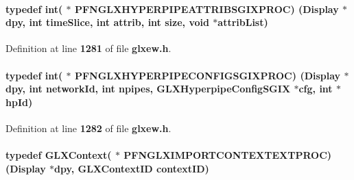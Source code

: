 \paragraph[{P\+F\+N\+G\+L\+X\+H\+Y\+P\+E\+R\+P\+I\+P\+E\+A\+T\+T\+R\+I\+B\+S\+G\+I\+X\+P\+R\+OC}]{\setlength{\rightskip}{0pt plus 5cm}typedef {\bf int}( $\ast$  P\+F\+N\+G\+L\+X\+H\+Y\+P\+E\+R\+P\+I\+P\+E\+A\+T\+T\+R\+I\+B\+S\+G\+I\+X\+P\+R\+OC) (Display $\ast$dpy, {\bf int} time\+Slice, {\bf int} attrib, {\bf int} {\bf size}, {\bf void} $\ast${\bf attrib\+List})}\label{glxew_8h_a8018a0c9128e5b524636d77ee15e4ef1}


Definition at line {\bf 1281} of file {\bf glxew.\+h}.

\paragraph[{P\+F\+N\+G\+L\+X\+H\+Y\+P\+E\+R\+P\+I\+P\+E\+C\+O\+N\+F\+I\+G\+S\+G\+I\+X\+P\+R\+OC}]{\setlength{\rightskip}{0pt plus 5cm}typedef {\bf int}( $\ast$  P\+F\+N\+G\+L\+X\+H\+Y\+P\+E\+R\+P\+I\+P\+E\+C\+O\+N\+F\+I\+G\+S\+G\+I\+X\+P\+R\+OC) (Display $\ast$dpy, {\bf int} network\+Id, {\bf int} npipes, {\bf G\+L\+X\+Hyperpipe\+Config\+S\+G\+IX} $\ast$cfg, {\bf int} $\ast$hp\+Id)}\label{glxew_8h_ac8a067c6309849f71d6aad85d90134fc}


Definition at line {\bf 1282} of file {\bf glxew.\+h}.

\paragraph[{P\+F\+N\+G\+L\+X\+I\+M\+P\+O\+R\+T\+C\+O\+N\+T\+E\+X\+T\+E\+X\+T\+P\+R\+OC}]{\setlength{\rightskip}{0pt plus 5cm}typedef {\bf G\+L\+X\+Context}( $\ast$  P\+F\+N\+G\+L\+X\+I\+M\+P\+O\+R\+T\+C\+O\+N\+T\+E\+X\+T\+E\+X\+T\+P\+R\+OC) (Display $\ast$dpy, {\bf G\+L\+X\+Context\+ID} context\+ID)}\label{glxew_8h_a20ad1b03ba9424074f7146bc9075b281}



